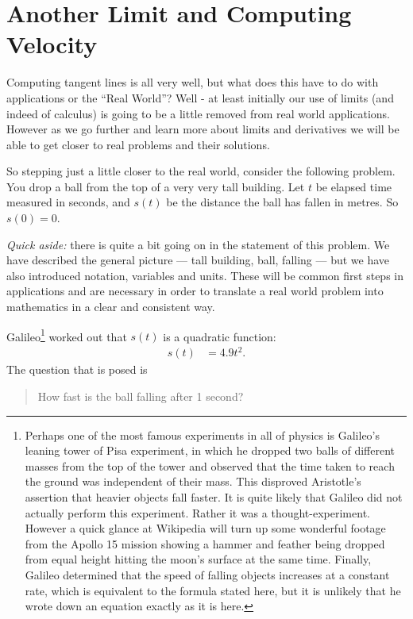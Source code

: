 \section{Another Limit and Computing Velocity} \label{sec velocity}
Computing tangent lines is all very well, but what does this have to do with
applications or the ``Real World''? Well - at least initially our use of limits
(and indeed of calculus) is going to be a little removed from real world
applications. However as we go further and learn more about limits and
derivatives we will be able to get closer to real problems and their solutions.

So stepping just a little closer to the real world, consider the following
problem. You drop a ball from the top of a very very tall building. Let $t$ be
elapsed time measured in seconds, and $s(t)$ be the distance the ball has fallen
in metres. So $s(0) = 0$.

\emph{Quick aside:} there is quite a bit going on in the statement of this
problem. We have described the general picture --- tall building, ball, falling
--- but we have also introduced notation, variables and units. These will be
common first steps in applications and are necessary in order to translate a
real world problem into mathematics in a clear and consistent way.


Galileo\footnote{Perhaps one of the most famous experiments in all of physics
is Galileo's leaning tower of Pisa experiment, in which he dropped two balls
of different masses from the top of the tower and observed that the time
taken to reach the ground was independent of their mass. This
disproved Aristotle's assertion that heavier objects fall faster. It is quite
likely that Galileo did not actually perform this experiment. Rather it was a
thought-experiment. However a quick glance at Wikipedia will turn up some
wonderful footage from the Apollo 15 mission showing a hammer and feather being
dropped from equal height hitting the moon's surface at the same time.
Finally, Galileo determined that the speed of falling objects increases at a
constant rate, which is equivalent to the formula stated here, but it is
unlikely that he wrote down an equation exactly as it is here.}
worked out that $s(t)$ is a quadratic function:
\begin{align*}
  s(t) &= 4.9 t^2.
\end{align*}
The question that is posed is
\begin{quote}
 How fast is the ball falling after 1 second?
\end{quote}

